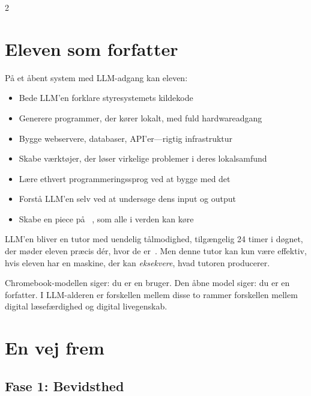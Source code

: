 \documentclass[11pt, a4paper]{article}
\begin{document}
\begin{multicols}{2}

\section{Eleven som forfatter}

På et åbent system med LLM-adgang kan eleven:

\begin{itemize}
  \item Bede LLM'en forklare styresystemets kildekode
  \item Generere programmer, der kører lokalt, med fuld hardwareadgang
  \item Bygge webservere, databaser, API'er---rigtig infrastruktur
  \item Skabe værktøjer, der løser virkelige problemer i deres lokalsamfund
  \item Lære ethvert programmeringssprog ved at bygge med det
  \item Forstå LLM'en selv ved at undersøge dens input og output
  \item Skabe en piece på \ac{}~\citep{scudder2026ac}, som alle i verden kan køre
\end{itemize}

LLM'en bliver en tutor med uendelig tålmodighed, tilgængelig 24 timer i døgnet, der møder eleven præcis dér, hvor de er~\citep{khan2024bravenew}. Men denne tutor kan kun være effektiv, hvis eleven har en maskine, der kan \emph{eksekvere}, hvad tutoren producerer.

Chromebook-modellen siger: du er en bruger. Den åbne model siger: du er en forfatter. I LLM-alderen er forskellen mellem disse to rammer forskellen mellem digital læsefærdighed og digital livegenskab.


\section{En vej frem}

\subsection{Fase 1: Bevidsthed}


\end{multicols}
\end{document}
